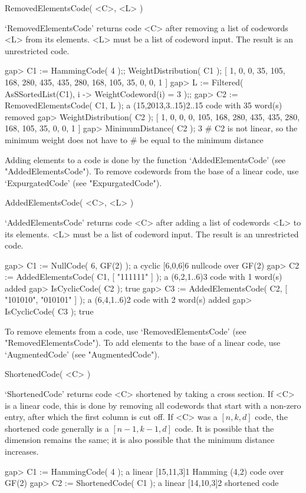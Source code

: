 \>RemovedElementsCode( <C>, <L> )

`RemovedElementsCode' returns code <C> after removing a list of codewords
<L> from its elements. <L> must be a  list of codeword input.  The result
is an unrestricted code.

\beginexample
gap> C1 := HammingCode( 4 );; WeightDistribution( C1 );
[ 1, 0, 0, 35, 105, 168, 280, 435, 435, 280, 168, 105, 35, 0, 0, 1 ]
gap> L := Filtered( AsSSortedList(C1), i -> WeightCodeword(i) = 3 );;
gap> C2 := RemovedElementsCode( C1, L );
a (15,2013,3..15)2..15 code with 35 word(s) removed
gap> WeightDistribution( C2 );
[ 1, 0, 0, 0, 105, 168, 280, 435, 435, 280, 168, 105, 35, 0, 0, 1 ]
gap> MinimumDistance( C2 );
3        # C2 is not linear, so the minimum weight does not have to
         # be equal to the minimum distance 
\endexample

Adding elements  to a  code is  done by  the function `AddedElementsCode'
(see "AddedElementsCode"). To remove codewords from the  base of a linear
code, use `ExpurgatedCode' (see "ExpurgatedCode").

\>AddedElementsCode( <C>, <L> )

`AddedElementsCode' returns code <C> after adding a list of codewords <L>
to its elements. <L> must be  a list of codeword  input. The result is an
unrestricted code.

\beginexample
gap> C1 := NullCode( 6, GF(2) );
a cyclic [6,0,6]6 nullcode over GF(2)
gap> C2 := AddedElementsCode( C1, [ "111111" ] );
a (6,2,1..6)3 code with 1 word(s) added
gap> IsCyclicCode( C2 );
true
gap> C3 := AddedElementsCode( C2, [ "101010", "010101" ] );
a (6,4,1..6)2 code with 2 word(s) added
gap> IsCyclicCode( C3 );
true 
\endexample

To remove   elements from a     code, use   `RemovedElementsCode'    (see
"RemovedElementsCode"). To add elements to the base of a linear code, use
`AugmentedCode' (see "AugmentedCode").

\>ShortenedCode( <C> )

`ShortenedCode' returns code <C> shortened by taking a cross section.  If
<C> is a  linear code, this is done  by removing all codewords that start
with a non-zero entry, after which  the first column  is cut off.  If <C>
was a  $[n,k,d]$ code, the  shortened  code generally  is a $[n-1,k-1,d]$
code. It  is possible that  the dimension  remains the  same; it  is also
possible that the minimum distance increases.

\beginexample
gap> C1 := HammingCode( 4 );
a linear [15,11,3]1 Hamming (4,2) code over GF(2)
gap> C2 := ShortenedCode( C1 );
a linear [14,10,3]2 shortened code 
\endexample

